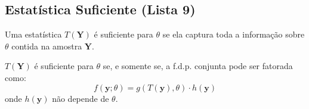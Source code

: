 \subsection{Estatística Suficiente (Lista 9)}
\begin{definicao}
Uma estatística $T(\boldsymbol{Y})$ é suficiente para $\theta$ se ela captura toda a informação sobre $\theta$ contida na amostra $\boldsymbol{Y}$.
\end{definicao}
\begin{teorema}
$T(\boldsymbol{Y})$ é suficiente para $\theta$ se, e somente se, a f.d.p. conjunta pode ser fatorada como:
$$ f(\boldsymbol{y}; \theta) = g(T(\boldsymbol{y}), \theta) \cdot h(\boldsymbol{y}) $$
onde $h(\boldsymbol{y})$ não depende de $\theta$.
\end{teorema}
